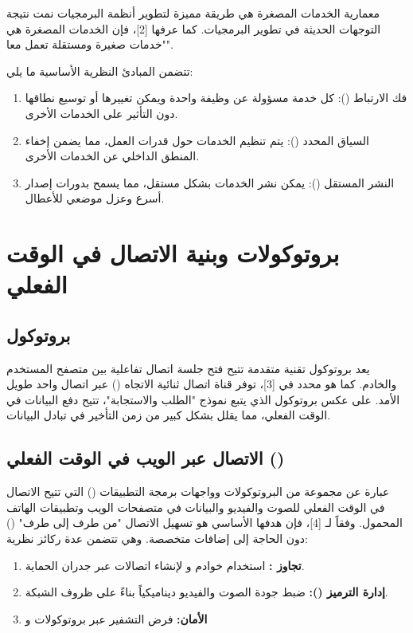 معمارية الخدمات المصغرة هي طريقة مميزة لتطوير أنظمة البرمجيات نمت نتيجة التوجهات الحديثة في تطوير البرمجيات. كما عرفها [2]، فإن الخدمات المصغرة هي "خدمات صغيرة ومستقلة تعمل معا".

تتضمن المبادئ النظرية الأساسية ما يلي:

\begin{enumerate}
  \item فك الارتباط (): كل خدمة مسؤولة عن وظيفة واحدة ويمكن تغييرها أو توسيع نطاقها دون التأثير على الخدمات الأخرى.
  \item السياق المحدد (): يتم تنظيم الخدمات حول قدرات العمل، مما يضمن إخفاء المنطق الداخلي عن الخدمات الأخرى.
  \item النشر المستقل (): يمكن نشر الخدمات بشكل مستقل، مما يسمح بدورات إصدار  أسرع وعزل موضعي للأعطال.
\end{enumerate}

\section{بروتوكولات وبنية الاتصال في الوقت الفعلي}

\subsection{بروتوكول }

يعد بروتوكول  تقنية متقدمة تتيح فتح جلسة اتصال تفاعلية بين متصفح المستخدم والخادم. كما هو محدد في [3]، توفر  قناة اتصال ثنائية الاتجاه () عبر اتصال  واحد طويل الأمد. على عكس بروتوكول  الذي يتبع نموذج "الطلب والاستجابة"، تتيح  دفع البيانات في الوقت الفعلي، مما يقلل بشكل كبير من زمن التأخير في تبادل البيانات.

\subsection{الاتصال عبر الويب في الوقت الفعلي ()}

 عبارة عن مجموعة من البروتوكولات وواجهات برمجة التطبيقات () التي تتيح الاتصال في الوقت الفعلي للصوت والفيديو والبيانات في متصفحات الويب وتطبيقات الهاتف المحمول. وفقاً لـ [4]، فإن هدفها الأساسي هو تسهيل الاتصال "من طرف إلى طرف" () دون الحاجة إلى إضافات متخصصة. وهي تتضمن عدة ركائز نظرية:

\begin{enumerate}
  \item \textbf{تجاوز :} استخدام خوادم  و لإنشاء اتصالات عبر جدران الحماية.
  \item \textbf{إدارة الترميز ():} ضبط جودة الصوت والفيديو ديناميكياً بناءً على ظروف الشبكة.
  \item \textbf{الأمان:} فرض التشفير عبر بروتوكولات  و
\end{enumerate}

